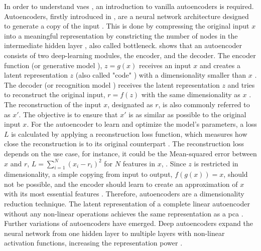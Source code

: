 In order to understand \glspl{vae} \cite{kingma2013AutoEncodingVariationalBayes}, an introduction to vanilla autoencoders is required.
Autoencoders, firstly introduced in \cite{rumelhart1986LearningInternalRepresentations}, are a neural network architecture designed to generate a copy of the input \cite{Goodfellow-et-al-2016, Bank2020Autoencoders}.
This is done by compressing the original input $x$ into a meaningful representation by constricting the number of nodes in the intermediate hidden layer \cite{aggarwal2018NeuralNetworksDeep, Bank2020Autoencoders}, also called bottleneck.
 shows that an autoencoder consists of two deep-learning modules, the encoder, and the decoder.
The encoder function (or generative model \cite{kingma2019IntroductionVariationalAutoencoders}), $z=g(x)$ receives an input $x$ and creates a latent representation $z$ (also called "code" \cite{aggarwal2018NeuralNetworksDeep}) with a dimensionality smaller than $x$ \cite{Goodfellow-et-al-2016, Bank2020Autoencoders}.
The decoder (or recognition model \cite{kingma2019IntroductionVariationalAutoencoders}) receives the latent representation $z$ and tries to reconstruct the original input, $r=f(z)$ with the same dimensionality as $x$ \cite{Goodfellow-et-al-2016}.
The reconstruction of the input $x$, designated as $r$, is also commonly referred to as $x'$. 
The objective is to ensure that $x'$ is as similar as possible to the original input $x$.
For the autoencoder to learn and optimize the model's parameters, a loss $L$ is calculated by applying a reconstruction loss function, which measures how close the reconstruction is to its original counterpart \cite{Bank2020Autoencoders, maheshwari2022AutoencoderIssuesChallenges}.
The reconstruction loss depends on the use case, for instance, it could be the Mean-squared error between $x$ and $r$, $L=\sum_{i=1}^{N}(x_i-r_i)^2$ for $N$ features in $x$, \cite{aggarwal2018NeuralNetworksDeep, Goodfellow-et-al-2016}.
Since $z$ is restricted in dimensionality, a simple copying from input to output, \ie $f(g(x))=x$, should not be possible, and the encoder should learn to create an approximation of $x$ with its most essential features \cite{aggarwal2018NeuralNetworksDeep}.
Therefore, autoencoders are a dimensionality reduction technique.
The latent representation of a complete linear autoencoder without any non-linear operations achieves the same representation as a \gls{pca} \cite{plaut2018PrincipalSubspacesPrincipal, Bank2020Autoencoders}.
Further variations of autoencoders have emerged.
Deep autoencoders expand the neural network from one hidden layer to multiple layers with non-linear activation functions, increasing the representation power \cite{aggarwal2018NeuralNetworksDeep}.
